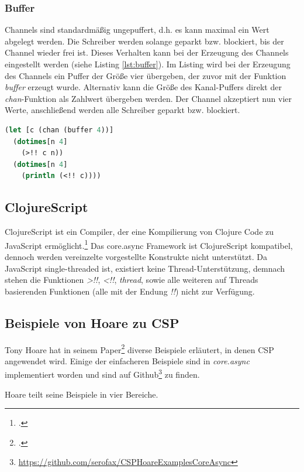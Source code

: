 \documentclass[12pt,a4paper,parskip=half,listof=totoc]{scrreprt}
\begin{document}
\subsubsection{Buffer}
Channels sind standardmäßig ungepuffert, d.h. es kann maximal ein Wert abgelegt werden. Die Schreiber werden solange geparkt bzw. blockiert, bis der Channel wieder frei ist. Dieses Verhalten kann bei der Erzeugung des Channels eingestellt werden (siehe Listing \ref{lst:buffer}). Im Listing wird bei der Erzeugung des Channels ein Puffer der Größe vier übergeben, der zuvor mit der Funktion \textit{buffer} erzeugt wurde. Alternativ kann die Größe des Kanal-Puffers direkt der \textit{chan}-Funktion als Zahlwert übergeben werden. Der Channel akzeptiert nun vier Werte, anschließend werden alle Schreiber geparkt bzw. blockiert.
\begin{lstlisting}[language=Clojure,caption=Buffer,label=lst:buffer]
(let [c (chan (buffer 4))]
  (dotimes[n 4]
    (>!! c n))
  (dotimes[n 4]
    (println (<!! c))))
\end{lstlisting}

\subsection{ClojureScript}
ClojureScript ist ein Compiler, der eine Kompilierung von Clojure Code zu JavaScript ermöglicht.\footcite{CLJS} Das core.async Framework ist ClojureScript kompatibel, dennoch werden vereinzelte vorgestellte Konstrukte nicht unterstützt. Da JavaScript single-threaded ist, existiert keine Thread-Unterstützung, demnach stehen die Funktionen \textit{>!!}, \textit{<!!}, \textit{thread}, sowie alle weiteren auf Threads basierenden Funktionen (alle mit der Endung \textit{!!}) nicht zur Verfügung.

\subsection{Beispiele von Hoare zu \acs{CSP}}
Tony Hoare hat in seinem Paper\footcite{CSP} diverse Beispiele erläutert, in denen \ac{CSP} angewendet wird. Einige der einfacheren Beispiele sind in \textit{core.async} implementiert worden und sind auf Github\footnote{\url{https://github.com/serofax/CSPHoareExamplesCoreAsync}} zu finden.

Hoare teilt seine Beispiele in vier Bereiche. 
\end{document}
